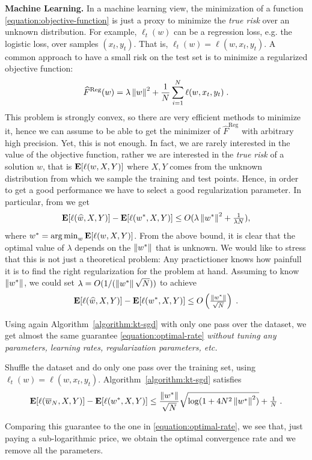 \textbf{Machine Learning.} In a machine learning view, the minimization of a
function \eqref{equation:objective-function} is just a proxy to minimize the
\emph{true risk} over an unknown distribution. For example, $\ell_t(w)$ can be
a regression loss, e.g. the logistic loss, over samples $(x_t, y_t)$. That is,
$\ell_t(w)=\ell(w,x_t,y_t)$. A common approach to have a small
risk on the test set is to minimize a regularized objective function:
%
\begin{equation}
\label{eq:reg_logloss}
\widehat{F}^{\text{Reg}}(w) = \lambda \left\|{w}\right\|^2 + \frac{1}{N} \sum_{i=1}^N \ell(w,x_t,y_t) \; .
\end{equation}
%
This problem is strongly convex, so there are very efficient methods to
minimize it, hence we can assume to be able to get the minimizer of
$\widehat{F}^{\text{Reg}}$ with arbitrary high precision. Yet, this is not
enough. In fact, we are rarely interested in the value of the objective
function, rather we are interested in the \emph{true risk} of a solution $w$,
that is $\operatorname*{\mathbf{E}}[\ell(w,X,Y)]$ where $X,Y$ comes from the unknown distribution
from which we sample the training and test points.  Hence, in order to get a
good performance we have to select a good regularization parameter. In
particular, from \cite{Sridharan-Shalev-Shwartz-Srebro-2009} we get
\[
\operatorname*{\mathbf{E}}[\ell(\widehat{w},X,Y)] - \operatorname*{\mathbf{E}}[\ell(w^*,X,Y)] \le O(\lambda \left\|{w^*}\right\|^2 + \tfrac{1}{\lambda N}),
\]
where $w^*=\operatorname*{arg\,min}_w \operatorname*{\mathbf{E}}[\ell(w,X,Y)]$.  From the above bound, it is clear
that the optimal value of $\lambda$ depends on the $\left\|{w^*}\right\|$ that is
unknown. We would like to stress that this is not just a theoretical problem:
Any practictioner knows how painfull it is to find the right regularization for
the problem at hand.  Assuming to know $\left\|{w^*}\right\|$, we could set $\lambda =
O(1/(\left\|{w^*}\right\| \sqrt{N}))$ to achieve
%
\begin{equation}
\label{equation:optimal-rate}
\operatorname*{\mathbf{E}}[\ell(\widehat{w},X,Y)] - \operatorname*{\mathbf{E}}[\ell(w^*,X,Y)] \le O\left(\tfrac{\left\|{w^*}\right\|}{\sqrt{N}}\right) \; .
\end{equation}

Using again Algorithm~\ref{algorithm:kt-sgd} with only one pass over the
dataset, we get almost the same guarantee \eqref{equation:optimal-rate}
\emph{without tuning any parameters, learning rates, regularization parameters,
etc.}
%
\begin{theorem}
Shuffle the dataset and do only one pass over the training set, using
$\ell_t(w)=\ell(w,x_t,y_t)$.  Algorithm~\ref{algorithm:kt-sgd}
satisfies
$$
\operatorname*{\mathbf{E}}[\ell(\overline{w}_N,X,Y)] - \operatorname*{\mathbf{E}}[\ell(w^*,X,Y)] \le \frac{\left\|{w^*}\right\|}{\sqrt{N}} \sqrt{\log(1+4 N^2 \left\|{w^*}\right\|^2)} + \tfrac{1}{N} \; .
$$
\end{theorem}
%
Comparing this guarantee to the one in \eqref{equation:optimal-rate}, we see
that, just paying a sub-logarithmic price, we obtain the optimal convergence
rate and we remove all the parameters.


